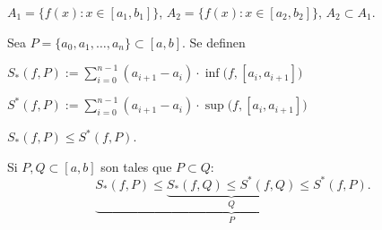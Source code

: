 \documentclass[11pt,a4paper]{article}
\begin{document}
$A_1=\{f(x):x\in[a_1,b_1]\}$, \quad $A_2=\{f(x):x\in[a_2,b_2]\}$, \quad $A_2\subset A_1$.

\begin{center}
\end{center}

\begin{definicion}
Sea $P=\{a_0,a_1,\dots,a_n\}\subset[a,b]$. Se definen
\begin{center}
$\displaystyle S_*(f,P) := \sum_{i=0}^{n-1}(a_{i+1}-a_i)\cdot\inf\bigl(f,[a_i,a_{i+1}]\bigr)$
\end{center}
\begin{center}
$\displaystyle S^*(f,P) := \sum_{i=0}^{n-1}(a_{i+1}-a_i)\cdot\sup\bigl(f,[a_i,a_{i+1}]\bigr)$
\end{center}
\end{definicion}

\begin{observacion}
$S_*(f,P)\le S^*(f,P)$.
\end{observacion}

\begin{proposicion}
Si $P,Q\subset[a,b]$ son tales que $P\subset Q$:
\[
  \underbrace{S_*(f,P)\le \underbrace{S_*(f,Q)\le S^*(f,Q)}_{Q}\le S^*(f,P)}_{P}.
\]
\end{proposicion}
\end{document}
